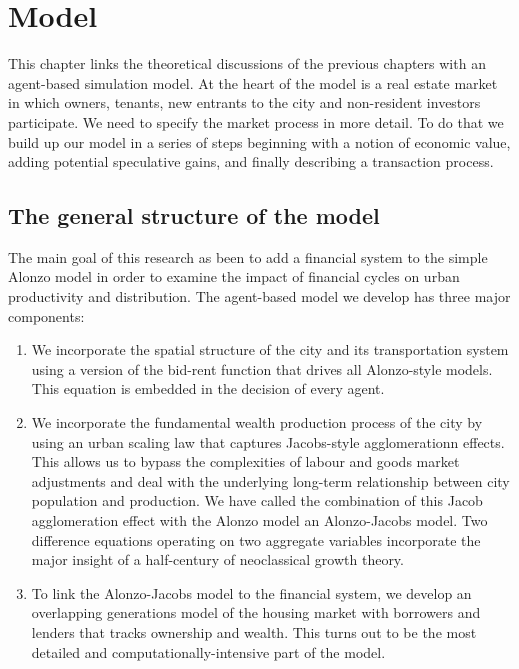 \chapter{Model} \label{chapter-model}


This chapter links the theoretical discussions of the previous chapters with an agent-based simulation model. At the heart of the model is a real estate market in which owners, tenants, new entrants to the city and non-resident investors participate. We need to specify the market process in more detail. To do that we build up our model in a series of steps beginning with a notion of economic value, adding potential speculative gains, and finally describing a transaction process. 

\section{The general structure of the model}
The main goal of this research as been to add a financial system to the simple Alonzo model in order to examine the impact of financial cycles on urban productivity and distribution. The \gls{agent-based model} we develop has three major components: 

\begin{enumerate}
\item We incorporate the spatial structure of the city and its transportation system using a version of the \gls{bid-rent function} that drives all Alonzo-style models. This equation is embedded in the decision of every agent.

\item We incorporate the fundamental wealth production process of the city by using an \gls{urban scaling} law that captures Jacobs-style agglomerationn effects. This allows us to bypass the complexities of labour and goods market adjustments and deal with the underlying long-term relationship between city  population and production. We have called the combination of this Jacob agglomeration effect with the Alonzo model an \gls{Alonzo-Jacobs model}.  Two difference equations operating on two aggregate variables incorporate the major insight of a half-century of \gls{neoclassical growth theory}.

\item To link the Alonzo-Jacobs model to the financial system, we develop an \gls{overlapping generations model} of the housing market with borrowers and lenders that tracks ownership and wealth. This turns out to be the most detailed and computationally-intensive part of the model.
\end{enumerate}

